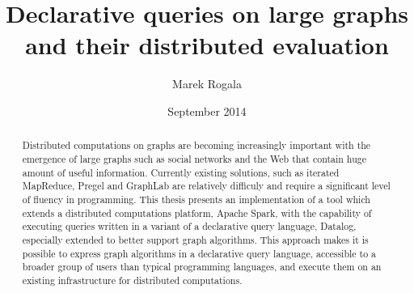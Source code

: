 \documentclass{pracamgr}
\author{Marek Rogala}
\title{Declarative queries on large graphs and their distributed evaluation}
\date{September 2014}
\theoremstyle{plain}
\theoremstyle{definition}
\theoremstyle{remark}
\begin{document}
\maketitle

\begin{abstract}
Distributed computations on graphs are becoming increasingly important with the emergence of large graphs such as social networks and the Web that contain huge amount of useful information.
Currently existing solutions, such as iterated MapReduce, Pregel and GraphLab are relatively difficuly and require a significant level of fluency in programming.
This thesis presents an implementation of a tool which extends a distributed computations platform, Apache Spark, with the capability of executing queries written in a variant of a declarative query language, Datalog, especially extended to better support graph algorithms.
This approach makes it is possible to express graph algorithms in a declarative query language, accessible to a broader group of users than typical programming languages, and execute them on an existing infrastructure for distributed computations.
\end{abstract}

\tableofcontents
















%
\end{document}
